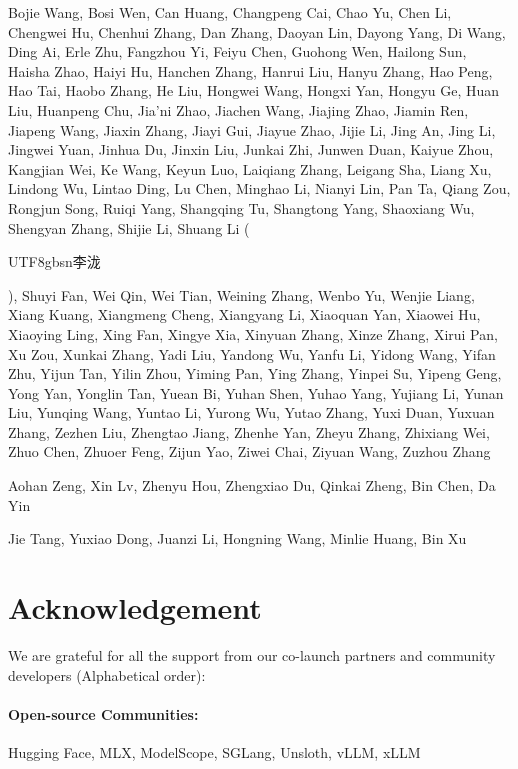 \documentclass{article}
\theoremstyle{definition}
\begin{document}

Bojie Wang, Bosi Wen, Can Huang, Changpeng Cai, Chao Yu, Chen Li, Chengwei Hu, Chenhui Zhang, Dan Zhang, Daoyan Lin, Dayong Yang, Di Wang, Ding Ai, Erle Zhu, Fangzhou Yi, Feiyu Chen, Guohong Wen, Hailong Sun, Haisha Zhao, Haiyi Hu, Hanchen Zhang, Hanrui Liu, Hanyu Zhang, Hao Peng, Hao Tai, Haobo Zhang, He Liu, Hongwei Wang, Hongxi Yan, Hongyu Ge, Huan Liu, Huanpeng Chu, Jia'ni Zhao, Jiachen Wang, Jiajing Zhao, Jiamin Ren, Jiapeng Wang, Jiaxin Zhang, Jiayi Gui, Jiayue Zhao, Jijie Li, Jing An, Jing Li, Jingwei Yuan, Jinhua Du, Jinxin Liu, Junkai Zhi, Junwen Duan, Kaiyue Zhou, Kangjian Wei, Ke Wang, Keyun Luo, Laiqiang Zhang, Leigang Sha, Liang Xu, Lindong Wu, Lintao Ding, Lu Chen, Minghao Li, Nianyi Lin, Pan Ta, Qiang Zou, Rongjun Song, Ruiqi Yang, Shangqing Tu, Shangtong Yang, Shaoxiang Wu, Shengyan Zhang, Shijie Li, Shuang Li (\begin{CJK*}{UTF8}{gbsn}李泷\end{CJK*}), Shuyi Fan, Wei Qin, Wei Tian, Weining Zhang, Wenbo Yu, Wenjie Liang, Xiang Kuang, Xiangmeng Cheng, Xiangyang Li, Xiaoquan Yan, Xiaowei Hu, Xiaoying Ling, Xing Fan, Xingye Xia, Xinyuan Zhang, Xinze Zhang, Xirui Pan, Xu Zou, Xunkai Zhang, Yadi Liu, Yandong Wu, Yanfu Li, Yidong Wang, Yifan Zhu, Yijun Tan, Yilin Zhou, Yiming Pan, Ying Zhang, Yinpei Su, Yipeng Geng, Yong Yan, Yonglin Tan, Yuean Bi, Yuhan Shen, Yuhao Yang, Yujiang Li, Yunan Liu, Yunqing Wang, Yuntao Li, Yurong Wu, Yutao Zhang, Yuxi Duan, Yuxuan Zhang, Zezhen Liu, Zhengtao Jiang, Zhenhe Yan, Zheyu Zhang, Zhixiang Wei, Zhuo Chen, Zhuoer Feng, Zijun Yao, Ziwei Chai, Ziyuan Wang, Zuzhou Zhang

Aohan Zeng, Xin Lv, Zhenyu Hou, Zhengxiao Du, Qinkai Zheng, Bin Chen, Da Yin

Jie Tang, Yuxiao Dong, Juanzi Li, Hongning Wang, Minlie Huang, Bin Xu

\section*{Acknowledgement}

We are grateful for all the support from our co-launch partners and community developers (Alphabetical order):

\paragraph{Open-source Communities:} Hugging Face, MLX, ModelScope, SGLang, Unsloth, vLLM, xLLM
\end{document}
